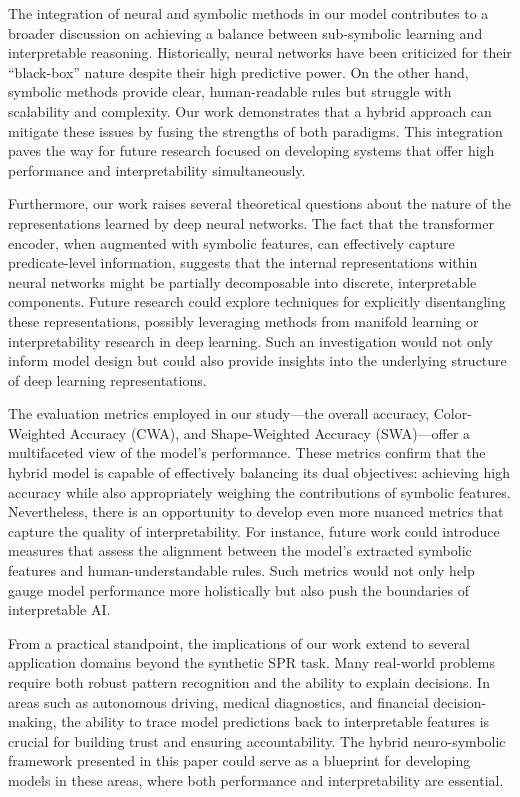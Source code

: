 \documentclass{article}
\begin{document}
The integration of neural and symbolic methods in our model contributes to a broader discussion on achieving a balance between sub-symbolic learning and interpretable reasoning. Historically, neural networks have been criticized for their “black-box” nature despite their high predictive power. On the other hand, symbolic methods provide clear, human-readable rules but struggle with scalability and complexity. Our work demonstrates that a hybrid approach can mitigate these issues by fusing the strengths of both paradigms. This integration paves the way for future research focused on developing systems that offer high performance and interpretability simultaneously.

Furthermore, our work raises several theoretical questions about the nature of the representations learned by deep neural networks. The fact that the transformer encoder, when augmented with symbolic features, can effectively capture predicate-level information, suggests that the internal representations within neural networks might be partially decomposable into discrete, interpretable components. Future research could explore techniques for explicitly disentangling these representations, possibly leveraging methods from manifold learning or interpretability research in deep learning. Such an investigation would not only inform model design but could also provide insights into the underlying structure of deep learning representations.

The evaluation metrics employed in our study—the overall accuracy, Color-Weighted Accuracy (CWA), and Shape-Weighted Accuracy (SWA)—offer a multifaceted view of the model’s performance. These metrics confirm that the hybrid model is capable of effectively balancing its dual objectives: achieving high accuracy while also appropriately weighing the contributions of symbolic features. Nevertheless, there is an opportunity to develop even more nuanced metrics that capture the quality of interpretability. For instance, future work could introduce measures that assess the alignment between the model’s extracted symbolic features and human-understandable rules. Such metrics would not only help gauge model performance more holistically but also push the boundaries of interpretable AI.

From a practical standpoint, the implications of our work extend to several application domains beyond the synthetic SPR task. Many real-world problems require both robust pattern recognition and the ability to explain decisions. In areas such as autonomous driving, medical diagnostics, and financial decision-making, the ability to trace model predictions back to interpretable features is crucial for building trust and ensuring accountability. The hybrid neuro-symbolic framework presented in this paper could serve as a blueprint for developing models in these areas, where both performance and interpretability are essential.
\end{document}
